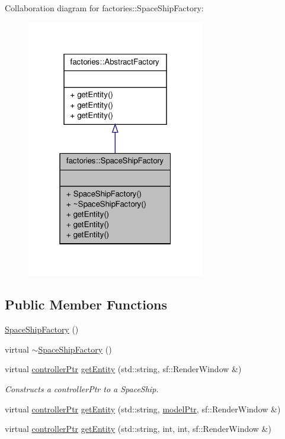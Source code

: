 \-Collaboration diagram for factories\-:\-:\-Space\-Ship\-Factory\-:\nopagebreak
\begin{figure}[H]
\begin{center}
\leavevmode
\includegraphics[width=220pt]{db/d7a/classfactories_1_1SpaceShipFactory__coll__graph}
\end{center}
\end{figure}
\subsection*{\-Public \-Member \-Functions}
\begin{DoxyCompactItemize}
\item 
\hyperlink{classfactories_1_1SpaceShipFactory_a3afe16a4e7c380ae0a60fd8df21fa076}{\-Space\-Ship\-Factory} ()
\item 
virtual \hyperlink{classfactories_1_1SpaceShipFactory_ae1d253c1354481f99d0144565fc0861a}{$\sim$\-Space\-Ship\-Factory} ()
\item 
virtual \hyperlink{Game_8h_a21b04f6cf2d5990b82725fac5ea2ce9a}{controller\-Ptr} \hyperlink{classfactories_1_1SpaceShipFactory_aff6bc8b01b4205907cff3268715a669d}{get\-Entity} (std\-::string, sf\-::\-Render\-Window \&)
\begin{DoxyCompactList}\small\item\em \-Constructs a controller\-Ptr to a \-Space\-Ship. \end{DoxyCompactList}\item 
virtual \hyperlink{Game_8h_a21b04f6cf2d5990b82725fac5ea2ce9a}{controller\-Ptr} \hyperlink{classfactories_1_1SpaceShipFactory_a82c8c58cb74b30d5c7d1e50f91b93811}{get\-Entity} (std\-::string, \hyperlink{ModelView_8h_a78966ddb517fca8d2b29a2bc5c31e74e}{model\-Ptr}, sf\-::\-Render\-Window \&)
\item 
virtual \hyperlink{Game_8h_a21b04f6cf2d5990b82725fac5ea2ce9a}{controller\-Ptr} \hyperlink{classfactories_1_1SpaceShipFactory_aa52f4097c0d4ffbad9bfe1b9b49eec05}{get\-Entity} (std\-::string, int, int, sf\-::\-Render\-Window \&)
\end{DoxyCompactItemize}


